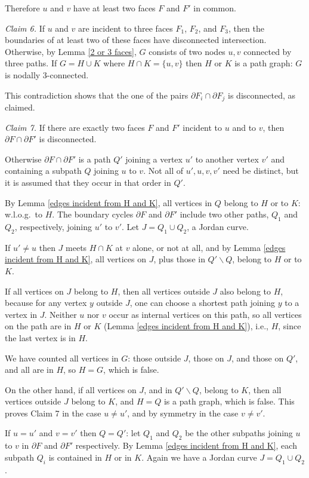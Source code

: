 Therefore $u$ and $v$ have at least two faces $F$ and $F'$ in common.

{\em Claim 6.}
If $u$ and $v$ are incident to three faces
$F_1$, $F_2$, and $F_3$, then the boundaries of at least two
of these faces have disconnected intersection.
Otherwise,
by Lemma \ref{2 or 3 faces}, $G$ consists of two
nodes $u,v$ connected by three paths. If $G= H\cup K$
where $H\cap K = \{u,v\}$ then $H$ or $K$ is
a path graph: $G$ is nodally 3-connected.

This contradiction shows that the one of the pairs
$\partial F_i \cap \partial F_j$ is disconnected, as
claimed.

{\em Claim 7.}
If there are exactly two faces $F$ and $F'$ incident
to $u$ and to $v$,
then $\partial F\cap \partial F'$ is disconnected.

Otherwise $\partial F\cap \partial F'$
is a path $Q'$ joining a vertex $u'$ to another
vertex $v'$ and containing a
subpath $Q$ joining $u$ to $v$.  Not all of
$u',u,v,v'$ need be distinct, but it is assumed
that they occur in that order in $Q'$.

By
Lemma \ref{edges incident from H and K},
all vertices in $Q$
belong to $H$ or to $K$: w.l.o.g.\ 
to $H$. The boundary cycles  $\partial F$ and
$\partial F'$ include two other paths, $Q_1$ and $Q_2$,
respectively, joining $u'$
to $v'$. Let $J=Q_1\cup Q_2$, a Jordan curve.

If $u'\not= u$ then $J$ meets $H\cap K$ at $v$ alone,
or not at all, and by Lemma
\ref{edges incident from H and K}, all vertices on
$J$, plus those in $Q'\backslash Q$, belong to $H$ or to $K$.

If all vertices on $J$ belong to $H$, then all
vertices outside $J$ also belong to $H$, because for
any vertex $y$ outside $J$, one can choose a shortest
path joining $y$ to a vertex in $J$.
Neither $u$ nor $v$ occur as internal vertices on this
path, so all vertices on the path are in $H$ or $K$ (Lemma
\ref{edges incident from H and K}),
i.e., $H$, since the last vertex is in $H$.

We have counted all vertices in $G$: those outside $J$,
those on $J$, and those on $Q'$, and all are in $H$,
so $H=G$, which is false.

On the other hand,
if all vertices on $J$, and in $Q'\backslash Q$, belong to $K$,
then all vertices outside $J$ belong to $K$,
and $H=Q$ is a path graph, which is false.
This proves Claim 7 in the case $u\not= u'$,
and by symmetry in the case $v\not= v'$.

If $u=u'$ and $v=v'$ then $Q=Q'$: let $Q_1$ and
$Q_2$ be the other subpaths joining $u$ to $v$
in $\partial F$ and $\partial F'$ respectively.
By Lemma \ref{edges incident from H and K},
each subpath $Q_i$ is contained in $H$ or
in $K$.  Again we have a Jordan curve
$J = Q_1 \cup Q_2$.

